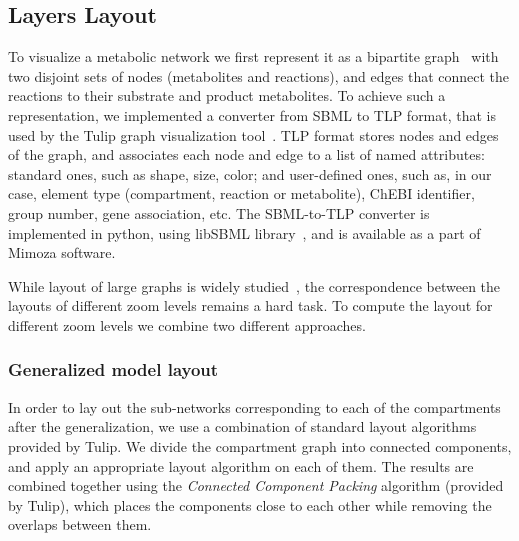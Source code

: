\documentclass{bmcart}
\begin{document}

\subsection*{Layers Layout}
To visualize a metabolic network we first represent it as a bipartite graph~\cite{Diestel2012} with two disjoint sets of nodes (metabolites and reactions), and edges that connect the reactions to their substrate and product metabolites. To achieve such a representation, we implemented a converter from SBML to TLP format, that is used by the Tulip graph visualization tool~\cite{Auber04}. TLP format stores nodes and edges of the graph, and associates each node and edge to a list of named attributes: standard ones, such as shape, size, color; and user-defined ones, such as, in our case, element type (compartment, reaction or metabolite), ChEBI identifier, group number, gene association, etc. The SBML-to-TLP converter is implemented in python, using libSBML library~\cite{Bornstein2008}, and is available as a part of Mimoza software. 

While layout of large graphs is widely studied~\cite{Unwin2006}, the correspondence between the layouts of different zoom levels remains a hard task. To compute the layout for different zoom levels we combine two different approaches.

\subsubsection*{Generalized model layout}
In order to lay out the sub-networks corresponding to each of the compartments after the generalization, we use a combination of standard layout algorithms provided by Tulip. We divide the compartment graph into connected components, and apply an appropriate layout algorithm on each of them. The results are combined together using the \emph{Connected Component Packing} algorithm (provided by Tulip), which places the components close to each other while removing the overlaps between them.
\end{document}
